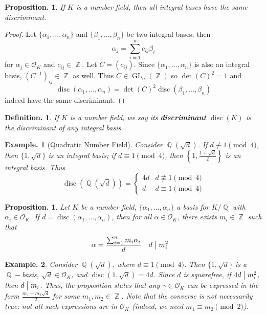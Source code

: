 \documentclass[11pt, a4paper]{memoir}
\DeclareMathOperator{\Q}{{\mathbb{Q}}}
\DeclareMathOperator{\Z}{{\mathbb{Z}}}
\renewcommand{\div}{\bigm|}
\theoremstyle{change}
\newtheorem{proposition}[theorem]{Proposition.}
\theoremstyle{plain}
\theoremstyle{nonumberplain}
\newtheorem{definition}{Definition.}
\newtheorem{example}{Example.}
\newtheorem{proof}{Proof}
\DeclareMathOperator{\disc}{disc}
\DeclareMathOperator{\GL}{GL}
\newcommand{\mbf}[1]{{\boldmath\bfseries #1}}
\numberwithin{equation}{section}
\begin{document}
\begin{proposition}
    If $K$ is a number field, then all integral bases have the same discriminant.
\end{proposition}
\begin{proof}
    Let $\{\alpha_1,\ldots,\alpha_n\}$ and $\{\beta_1,\ldots,\beta_n\}$ be two integral bases; then
    \begin{equation*}
        \alpha_j=\sum\limits_{i=1}^n c_{ij}\beta_i
    \end{equation*}
    for $\alpha_j\in\mathcal{O}_K$ and $c_{ij}\in\Z$.
    Let $C=(c_{ij})$.
    Since $\{\alpha_1,\ldots,\alpha_n\}$ is also an integral basis, $\left(C^{-1}\right)_{ij}\in\Z$ as well.
    Thus $C\in\GL_n(\Z)$ so $\det(C)^2=1$ and
    \begin{equation*}
        \disc(\alpha_1,\ldots,\alpha_n)=\det(C)^2\disc(\beta_1,\ldots,\beta_n)
    \end{equation*}
    indeed have the same discriminant.
\end{proof}
\begin{definition}
    If $K$ is a number field, we say its \mbf{discriminant} $\disc(K)$ is the discriminant of any integral basis.
\end{definition}
\begin{example}[Quadratic Number Field]
    Consider $\Q(\sqrt{d})$.
    If $d\nequiv 1\pmod{4}$, then $\{1,\sqrt{d}\}$ is an integral basis; if $d\equiv 1\pmod{4}$, then $\left\{1,\frac{1+\sqrt{d}}{2}\right\}$ is an integral basis.
    Thus
    \begin{equation*}
        \disc(\Q(\sqrt{d}))=
        \begin{cases}
            4d & d\nequiv 1\pmod{4}\\
            d & d\equiv 1\pmod{4}
        \end{cases}
    \end{equation*}
\end{example}
\begin{proposition}\label{prop:ext}
    Let $K$ be a number field, $\{\alpha_1,\ldots,\alpha_n\}$ a basis for $K/\Q$ with $\alpha_i\in\mathcal{O}_K$.
    If $d=\disc(\alpha_1,\ldots,\alpha_n)$, then for all $\alpha\in\mathcal{O}_K$, there exists $m_i\in\Z$ such that
    \begin{align*}
        \alpha&=\frac{\sum_{i=1}^n m_i\alpha_i}{d} &  d&\div m_i^2
    \end{align*}
\end{proposition}
\begin{example}
    Consider $\Q(\sqrt{d})$, where $d\equiv 1\pmod{4}$.
    Then $\{1,\sqrt{d}\}$ is a $\Q-$basis, $\sqrt{d}\in\mathcal{O}_K$, and $\disc(1,\sqrt{d})=4d$.
    Since $d$ is squarefree, if $4d\div m_i^2$, then $d\div m_i$.
    Thus, the proposition states that any $\gamma\in\mathcal{O}_K$ can be expressed in the form $\frac{m_1+m_2\sqrt{d}}{2}$ for some $m_1,m_2\in\Z$.
    Note that the converse is not necessarily true: not all such expressions are in $\mathcal{O}_K$ (indeed, we need $m_1\equiv m_2\pmod{2}$).
\end{example}
\end{document}
